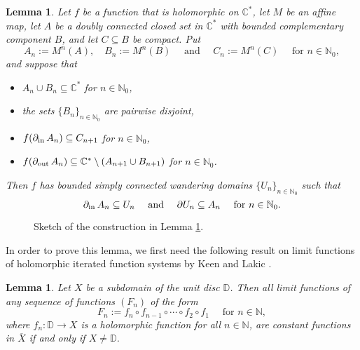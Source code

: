 \documentclass[a4paper, 12pt, reqno]{amsart}
\numberwithin{equation}{section}
\theoremstyle{plain}
\newtheorem{lem}[thm]{Lemma}
\theoremstyle{definition}
\theoremstyle{remark}
\newcommand{\C}{{\mathbb{C}}}
\newcommand{\N}{{\mathbb{N}}}
\begin{document}
\begin{lem}
Let $f$ be a function that is holomorphic on $\C^*$, let $M$ be an affine map, let $A$ be a doubly connected closed set in $\C^*$ with bounded complementary component $B$, and let $C\subseteq B$ be compact. Put
$$
A_n:=M^n(A),\quad B_n:=M^n(B)\quad \mbox{ and }\quad C_n:=M^n(C)\quad \mbox{ for } n\in\N_0,
$$
and suppose that 
\begin{itemize}
\item $A_n\cup B_n\subseteq \C^*$ for $n\in\N_0$,
\item the sets $\{B_n\}_{n\in\N_0}$ are pairwise disjoint,
\item $f(\partial_\textup{in}\,A_n)\subseteq C_{n+1}$ for $n\in\N_0$,
\item $f(\partial_\textup{out}\,A_n)\subseteq \C^*\setminus (A_{n+1}\cup B_{n+1})$ for $n\in\N_0$.
\end{itemize}
Then $f$ has bounded simply connected wandering domains $\{U_n\}_{n\in\N_0}$ such that
$$
\partial_\textup{in}\,A_n\subseteq U_n \quad \mbox{ and } \quad \partial U_n \subseteq A_n \quad \mbox{ for } n\in\N_0.
$$
\label{lem:Julia-in-annulus}
\end{lem}


\begin{figure}[h!]
\centering
\vspace*{-10pt}
\def\svgwidth{\linewidth}

\vspace{15pt}
\caption[Sketch of a construction which implies that a function has a wandering domain]{Sketch of the construction in Lemma \ref{lem:Julia-in-annulus}.}
\label{fig:annuli-lemma} 
\end{figure}


In order to prove this lemma, we first need the following result on limit functions of holomorphic iterated function systems by Keen and Lakic \cite[Theorem~1]{keen-lakic03}. %

\begin{lem}
Let $X$ be a subdomain of the unit disc $\mathbb D$. Then all limit functions of any sequence of functions $(F_n)$ of the form
$$
F_n:=f_n\circ f_{n-1}\circ \cdots \circ f_2\circ f_1\quad \mbox{ for } n\in\N,
$$
where $f_n:\mathbb D\to X$ is a holomorphic function for all $n\in \N$, are constant functions in $\overline{X}$ if and only if $X\neq\mathbb D$.
\label{lem:keen-lakic}
\end{lem}
\end{document}

